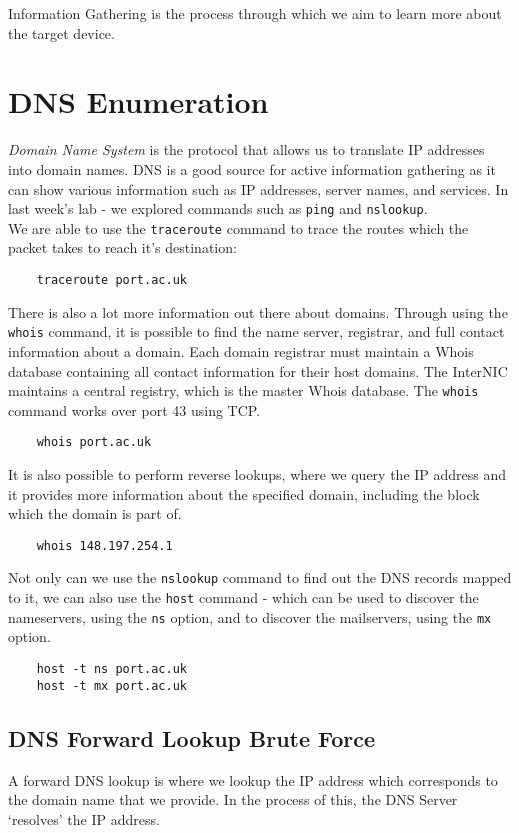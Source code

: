 
Information Gathering is the process through which we aim to learn more about the target device.

\section{DNS Enumeration}
\textit{Domain Name System} is the protocol that allows us to translate IP addresses into domain names. DNS is a good source for active information gathering as it can show various information such as IP addresses, server names, and services. In last week's lab - we explored commands such as \verb|ping| and \verb|nslookup|.\\

We are able to use the \verb|traceroute| command to trace the routes which the packet takes to reach it's destination:
\begin{verbatim}
    traceroute port.ac.uk
\end{verbatim}

There is also a lot more information out there about domains. Through using the \verb|whois| command, it is possible to find the name server, registrar, and full contact information about a domain. Each domain registrar must maintain a Whois database containing all contact information for their host domains. The InterNIC maintains a central registry, which is the master Whois database. The \verb|whois| command works over port 43 using TCP.
\begin{verbatim}
    whois port.ac.uk
\end{verbatim}

It is also possible to perform reverse lookups, where we query the IP address and it provides more information about the specified domain, including the block which the domain is part of.
\begin{verbatim}
    whois 148.197.254.1
\end{verbatim}

Not only can we use the \verb|nslookup| command to find out the DNS records mapped to it, we can also use the \verb|host| command - which can be used to discover the nameservers, using the \verb|ns| option, and to discover the mailservers, using the \verb|mx| option.
\begin{verbatim}
    host -t ns port.ac.uk
    host -t mx port.ac.uk
\end{verbatim}

\subsection{DNS Forward Lookup Brute Force}
A forward DNS lookup is where we lookup the IP address which corresponds to the domain name that we provide. In the process of this, the DNS Server `resolves' the IP address.\\

